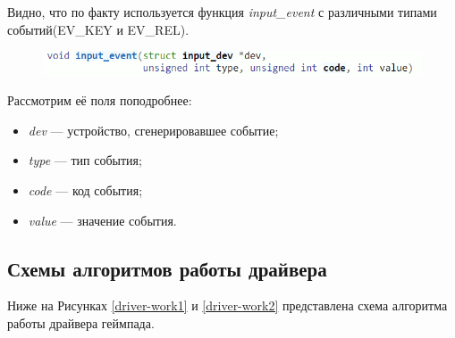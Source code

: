 Видно, что по факту используется функция \textit{input\_event} с различными типами событий(EV\_KEY и EV\_REL).
\begin{figure}[h!]
	\centering
	\includegraphics[scale=0.9]{img/input-event.png}
\end{figure}\par

Рассмотрим её поля поподробнее:
\begin{itemize}
	\item \textit{dev} --- устройство, сгенерировавшее событие;
	\item \textit{type} --- тип события;
	\item \textit{code} --- код события;
	\item \textit{value} --- значение события.
\end{itemize}\par

\subsection{Схемы алгоритмов работы драйвера}
Ниже на Рисунках \ref{driver-work1} и \ref{driver-work2} представлена схема алгоритма работы драйвера геймпада.

